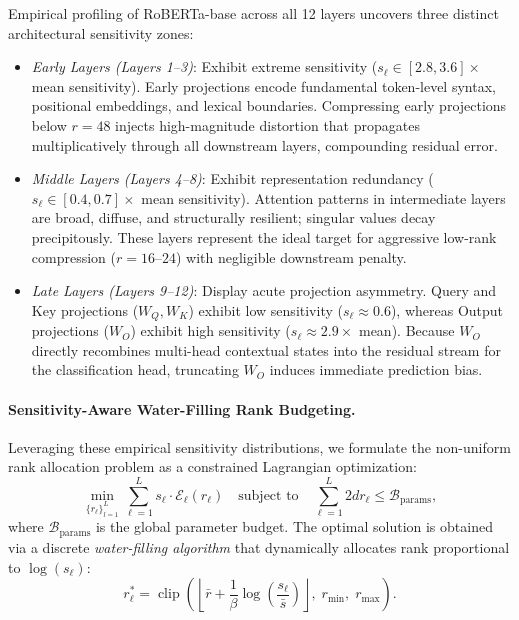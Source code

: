 Empirical profiling of RoBERTa-base across all 12 layers uncovers three distinct architectural sensitivity zones:
\begin{itemize}
    \item \emph{Early Layers (Layers 1--3)}: Exhibit extreme sensitivity ($s_\ell \in [2.8, 3.6]\times$ mean sensitivity). Early projections encode fundamental token-level syntax, positional embeddings, and lexical boundaries. Compressing early projections below $r=48$ injects high-magnitude distortion that propagates multiplicatively through all downstream layers, compounding residual error.
    \item \emph{Middle Layers (Layers 4--8)}: Exhibit representation redundancy ($s_\ell \in [0.4, 0.7]\times$ mean sensitivity). Attention patterns in intermediate layers are broad, diffuse, and structurally resilient; singular values decay precipitously. These layers represent the ideal target for aggressive low-rank compression ($r=16\text{--}24$) with negligible downstream penalty.
    \item \emph{Late Layers (Layers 9--12)}: Display acute projection asymmetry. Query and Key projections ($W_Q, W_K$) exhibit low sensitivity ($s_\ell \approx 0.6$), whereas Output projections ($W_O$) exhibit high sensitivity ($s_\ell \approx 2.9\times$ mean). Because $W_O$ directly recombines multi-head contextual states into the residual stream for the classification head, truncating $W_O$ induces immediate prediction bias.
\end{itemize}

\paragraph{Sensitivity-Aware Water-Filling Rank Budgeting.}
Leveraging these empirical sensitivity distributions, we formulate the non-uniform rank allocation problem as a constrained Lagrangian optimization:
\begin{equation}
\min_{\{r_\ell\}_{l=1}^L} \sum_{\ell=1}^L s_\ell \cdot \mathcal{E}_\ell(r_\ell) \quad \text{subject to} \quad \sum_{\ell=1}^L 2 d r_\ell \le \mathcal{B}_{\text{params}},
\label{eq:water_filling_formulation}
\end{equation}
where $\mathcal{B}_{\text{params}}$ is the global parameter budget. The optimal solution is obtained via a discrete \emph{water-filling algorithm} that dynamically allocates rank proportional to $\log(s_\ell)$:
\begin{equation}
r_\ell^* = \operatorname{clip}\left( \left\lfloor \bar{r} + \frac{1}{\beta} \log\left(\frac{s_\ell}{\bar{s}}\right) \right\rfloor, \; r_{\min}, \; r_{\max} \right).
\label{eq:water_filling_solution}
\end{equation}

